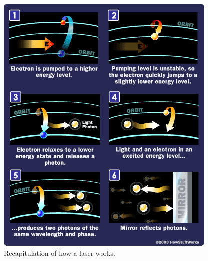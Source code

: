 \documentclass[12pt singlecol]{article}
\begin{document}
\begin{flushleft}
\begin{figure}
	\centering	
	\includegraphics[width=\linewidth]{laserhow}
	\caption{Recapitulation of how a laser works. \cite{Weschler00}}
	\label{fig:how}
\end{figure}


\end{flushleft}
\end{document}
